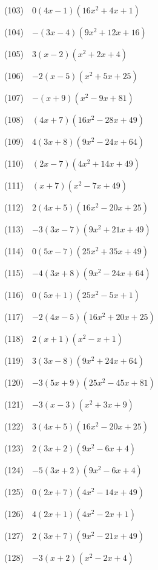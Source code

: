 \documentclass[a4j,twocolumn,10pt,fleqn]{jarticle}
\begin{document}
(103)~~$0\left(4 x - 1\right) \left(16 x^{2} + 4 x + 1\right)$

(104)~~$-\left(3 x - 4\right) \left(9 x^{2} + 12 x + 16\right)$

(105)~~$3\left(x - 2\right) \left(x^{2} + 2 x + 4\right)$

(106)~~$-2\left(x - 5\right) \left(x^{2} + 5 x + 25\right)$

(107)~~$-\left(x + 9\right) \left(x^{2} - 9 x + 81\right)$

(108)~~$\left(4 x + 7\right) \left(16 x^{2} - 28 x + 49\right)$

(109)~~$4\left(3 x + 8\right) \left(9 x^{2} - 24 x + 64\right)$

(110)~~$\left(2 x - 7\right) \left(4 x^{2} + 14 x + 49\right)$

(111)~~$\left(x + 7\right) \left(x^{2} - 7 x + 49\right)$

(112)~~$2\left(4 x + 5\right) \left(16 x^{2} - 20 x + 25\right)$

(113)~~$-3\left(3 x - 7\right) \left(9 x^{2} + 21 x + 49\right)$

(114)~~$0\left(5 x - 7\right) \left(25 x^{2} + 35 x + 49\right)$

(115)~~$-4\left(3 x + 8\right) \left(9 x^{2} - 24 x + 64\right)$

(116)~~$0\left(5 x + 1\right) \left(25 x^{2} - 5 x + 1\right)$

(117)~~$-2\left(4 x - 5\right) \left(16 x^{2} + 20 x + 25\right)$

(118)~~$2\left(x + 1\right) \left(x^{2} - x + 1\right)$

(119)~~$3\left(3 x - 8\right) \left(9 x^{2} + 24 x + 64\right)$

(120)~~$-3\left(5 x + 9\right) \left(25 x^{2} - 45 x + 81\right)$

(121)~~$-3\left(x - 3\right) \left(x^{2} + 3 x + 9\right)$

(122)~~$3\left(4 x + 5\right) \left(16 x^{2} - 20 x + 25\right)$

(123)~~$2\left(3 x + 2\right) \left(9 x^{2} - 6 x + 4\right)$

(124)~~$-5\left(3 x + 2\right) \left(9 x^{2} - 6 x + 4\right)$

(125)~~$0\left(2 x + 7\right) \left(4 x^{2} - 14 x + 49\right)$

(126)~~$4\left(2 x + 1\right) \left(4 x^{2} - 2 x + 1\right)$

(127)~~$2\left(3 x + 7\right) \left(9 x^{2} - 21 x + 49\right)$

(128)~~$-3\left(x + 2\right) \left(x^{2} - 2 x + 4\right)$
\end{document}
